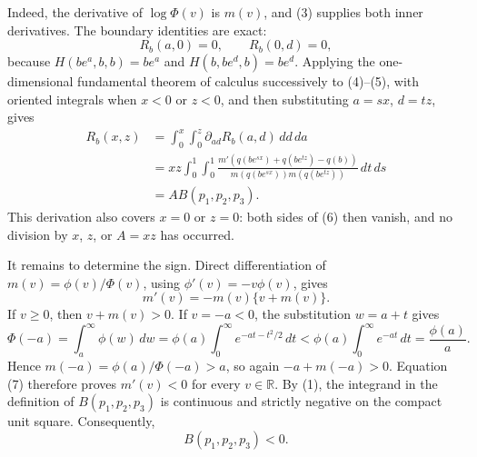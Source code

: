 Indeed, the derivative of \(\log\Phi(v)\) is \(m(v)\), and (3) supplies both inner derivatives.  The boundary identities are exact:
\[
R_b(a,0)=0,
\qquad R_b(0,d)=0,
\tag{5}
\]
because \(H(be^a,b,b)=be^a\) and \(H(b,be^d,b)=be^d\).  Applying the one-dimensional fundamental theorem of calculus successively to (4)--(5), with oriented integrals when \(x<0\) or \(z<0\), and then substituting \(a=sx\), \(d=tz\), gives
\[
\begin{aligned}
R_b(x,z)
&=\int_0^x\!\int_0^z\partial_{ad}R_b(a,d)\,dd\,da\\
&=xz\int_0^1\!\int_0^1
\frac{m'\!\left(q(be^{sx})+q(be^{tz})-q(b)\right)}
{m(q(be^{sx}))m(q(be^{tz}))}\,dt\,ds\\
&=A B(p_1,p_2,p_3).
\end{aligned}
\tag{6}
\]
This derivation also covers \(x=0\) or \(z=0\): both sides of (6) then vanish, and no division by \(x\), \(z\), or \(A=xz\) has occurred.

It remains to determine the sign.  Direct differentiation of \(m(v)=\phi(v)/\Phi(v)\), using \(\phi'(v)=-v\phi(v)\), gives
\[
m'(v)=-m(v)\{v+m(v)\}.
\tag{7}
\]
If \(v\ge0\), then \(v+m(v)>0\).  If \(v=-a<0\), the substitution \(w=a+t\) gives
\[
\Phi(-a)=\int_a^\infty\phi(w)\,dw
=\phi(a)\int_0^\infty e^{-at-t^2/2}\,dt
<\phi(a)\int_0^\infty e^{-at}\,dt
=\frac{\phi(a)}{a}.
\tag{8}
\]
Hence \(m(-a)=\phi(a)/\Phi(-a)>a\), so again \(-a+m(-a)>0\).  Equation (7) therefore proves \(m'(v)<0\) for every \(v\in\mathbb R\).  By (1), the integrand in the definition of \(B(p_1,p_2,p_3)\) is continuous and strictly negative on the compact unit square.  Consequently,
\[
B(p_1,p_2,p_3)<0.
\tag{9}
\]

